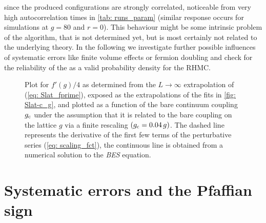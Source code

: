 since the produced configurations are strongly correlated, noticeable from very high autocorrelation times in \autoref{tab: runs_param} (similar response occurs for simulations at $g=80$ and $r=0$). This behaviour might be some intrinsic problem of the algorithm, that is not determined yet, but is most certainly not related to the underlying theory. In the following we investigate further possible influences of systematic errors like finite volume effects or fermion doubling and check for the reliability of the  as a valid probability density for the RHMC.
%
%
%
\begin{figure}
\centering

\caption{Plot for $f'(g)/4$ as determined from the $L\to\infty$ extrapolation of (\ref{eq: Slat_fprime}), exposed as the extrapolations of the fits in \autoref{fig: Slat-c_g}, and plotted as a function of the bare continuum coupling $g_{\rm c}$ under the assumption that it is related to the bare coupling on the lattice $g$ via a finite rescaling $(g_{\rm c}=0.04\, g)$. The dashed line represents the derivative of the first few terms of the perturbative series (\ref{eq: scaling_fct}), the continuous line is obtained from a numerical solution to the \textit{BES} equation.
\label{fig: f_prime_Lm4}}
\end{figure}
%
%
%
%
%
%
%
%
\section{Systematic errors and the Pfaffian sign}\label{sec: sys_errors}